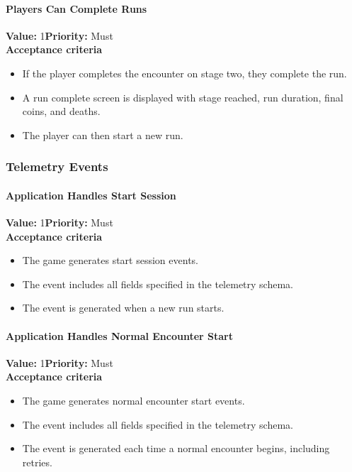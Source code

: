 \paragraph{Players Can Complete Runs}
\textbf{Value:} 1\quad \textbf{Priority:} Must\\
\textbf{Acceptance criteria}
\begin{itemize}
  \item If the player completes the encounter on stage two, they complete the run.
  \item A run complete screen is displayed with stage reached, run duration, final coins, and deaths.
  \item The player can then start a new run.
\end{itemize}

\subsubsection{Telemetry Events}

\paragraph{Application Handles Start Session}
\textbf{Value:} 1\quad \textbf{Priority:} Must\\
\textbf{Acceptance criteria}
\begin{itemize}
  \item The game generates start session events.
  \item The event includes all fields specified in the telemetry schema.
  \item The event is generated when a new run starts.
\end{itemize}

\paragraph{Application Handles Normal Encounter Start}
\textbf{Value:} 1\quad \textbf{Priority:} Must\\
\textbf{Acceptance criteria}
\begin{itemize}
  \item The game generates normal encounter start events.
  \item The event includes all fields specified in the telemetry schema.
  \item The event is generated each time a normal encounter begins, including retries.
\end{itemize}

